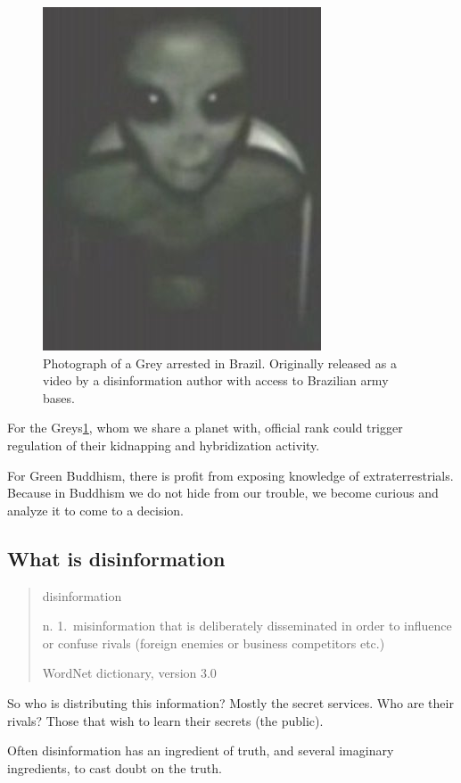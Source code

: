 \documentclass{report}
\begin{document}
\begin{figure}
  \includegraphics{photograph/gray-alien-upper-body.jpg}
  \caption{Photograph of a Grey arrested in Brazil. Originally released as a video by a
disinformation author with access to Brazilian army bases.}
\label{fig:grey}
\end{figure}

For the Greys\ref{fig:grey}, whom we share a planet with, official rank could trigger
regulation of their kidnapping and hybridization activity. 

For Green Buddhism, there is profit from exposing knowledge of
extraterrestrials. Because in Buddhism we do not hide from our trouble, we
become curious and analyze it to come to a decision.

\subsection{What is disinformation}
\label{disinformation}

\blockquote[WordNet dictionary, version 3.0]{disinformation

n. 1.\  misinformation that is deliberately disseminated in order to influence or
confuse rivals (foreign enemies or business competitors etc.)}

So who is distributing this information? Mostly the secret services.
Who are their rivals? Those that wish to learn their secrets (the public).

Often disinformation has an ingredient of truth, and several imaginary
ingredients, to cast doubt on the truth.
\end{document}
